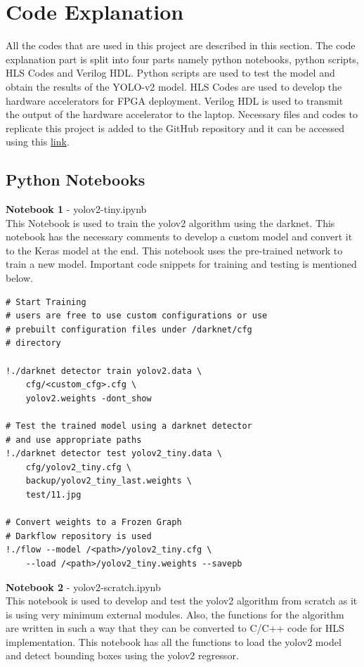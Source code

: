 \documentclass[a4paper,12pt,oneside]{book}
\begin{document}
\section{Code Explanation}
All the codes that are used in this project are described in this section. The code explanation part is split into four parts namely python notebooks, python scripts, HLS Codes and Verilog HDL. Python scripts are used to test the model and obtain the results of the YOLO-v2 model. HLS Codes are used to develop the hardware accelerators for FPGA deployment. Verilog HDL is used to transmit the output of the hardware accelerator to the laptop. Necessary files and codes to replicate this project is added to the GitHub repository and it can be accessed using this \href{https://github.com/hari-vickey/FPGA-for-Edge}{link}.

\subsection*{Python Notebooks}
\textbf{Notebook 1} - yolov2-tiny.ipynb\vspace{0.2cm}\\
This Notebook is used to train the yolov2 algorithm using the darknet. This notebook has the necessary comments to develop a custom model and convert it to the Keras model at the end. This notebook uses the pre-trained network to train a new model. Important code snippets for training and testing is mentioned below.\vspace{0.2cm}
\begin{lstlisting}
# Start Training
# users are free to use custom configurations or use
# prebuilt configuration files under /darknet/cfg 
# directory

!./darknet detector train yolov2.data \
    cfg/<custom_cfg>.cfg \
    yolov2.weights -dont_show

# Test the trained model using a darknet detector 
# and use appropriate paths
!./darknet detector test yolov2_tiny.data \
    cfg/yolov2_tiny.cfg \
    backup/yolov2_tiny_last.weights \
    test/11.jpg

# Convert weights to a Frozen Graph
# Darkflow repository is used
!./flow --model /<path>/yolov2_tiny.cfg \
    --load /<path>/yolov2_tiny.weights --savepb

\end{lstlisting}
\textbf{Notebook 2} - yolov2-scratch.ipynb\vspace{0.2cm}\\
This notebook is used to develop and test the yolov2 algorithm from scratch as it is using very minimum external modules. Also, the functions for the algorithm are written in such a way that they can be converted to C/C++ code for HLS implementation. This notebook has all the functions to load the yolov2 model and detect bounding boxes using the yolov2 regressor.\vspace{0.2cm}
\end{document}
